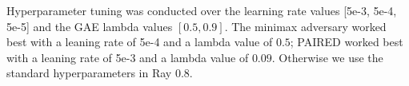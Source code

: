 \documentclass{article}
\begin{document}
\begin{appendix}
Hyperparameter tuning was conducted over the learning rate values [5e-3, 5e-4, 5e-5] and the GAE lambda values $[0.5, 0.9]$.  The minimax adversary worked best with a leaning rate of 5e-4 and a lambda value of $0.5$; PAIRED worked best with a leaning rate of 5e-3 and a lambda value of $0.09$.  Otherwise we use the standard hyperparameters in Ray 0.8.

\end{appendix}
\end{document}
